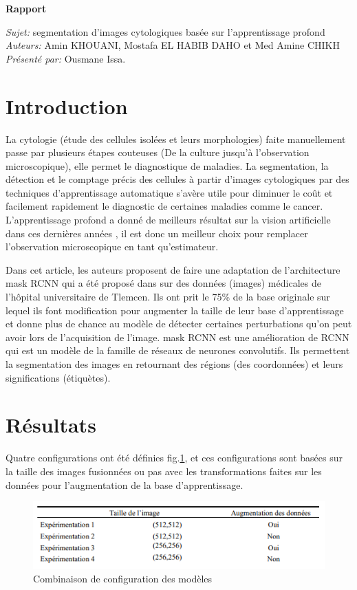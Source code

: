 \documentclass[french]{report}
\begin{document}
\begin{center}
	\LARGE \textbf{Rapport}
\end{center}
\textit{Sujet:} segmentation d'images cytologiques basée sur l'apprentissage profond\\
\textit{Auteurs:} Amin KHOUANI, Mostafa EL HABIB DAHO et Med Amine CHIKH \\
\textit{Présenté par:} Ousmane Issa.
\section*{Introduction}
La cytologie (étude des cellules isolées et leurs morphologies) faite manuellement passe par plusieurs étapes couteuses (De la culture jusqu'à l'observation microscopique), elle permet le diagnostique de maladies. La segmentation, la détection et le comptage précis des cellules à partir d'images cytologiques par des techniques d'apprentissage automatique s'avère utile pour diminuer le coût et facilement rapidement le diagnostic de certaines maladies comme le cancer. L'apprentissage profond a donné de meilleurs résultat sur la vision artificielle dans ces dernières années \cite{im1, rcnn}, il est donc un meilleur choix pour remplacer l'observation microscopique en tant qu'estimateur.

Dans cet article, les auteurs proposent de faire une adaptation de l'architecture mask RCNN qui a été proposé dans \cite{rcnn} sur des données (images) médicales de l'hôpital universitaire de Tlemcen. Ils ont prit le 75\% de la base originale sur lequel ils font modification pour augmenter la taille de leur base d'apprentissage et donne plus de chance au modèle de détecter certaines perturbations qu'on peut avoir lors de l'acquisition de l'image. mask RCNN est une amélioration de RCNN qui est un modèle de la famille de réseaux de neurones convolutifs. Ils permettent la segmentation des images en retournant des régions (des coordonnées) et leurs significations (étiquètes).   
\section*{Résultats}
Quatre configurations ont été définies fig.{\ref{comb}}, et ces configurations sont basées sur la taille des images fusionnées ou pas avec les transformations faites sur les données pour l'augmentation de la base d'apprentissage. 

\begin{figure}[H]
	\centering
	\includegraphics{images/rapport_1.PNG}
	\caption{Combinaison de configuration des modèles}
	\label{comb}
\end{figure} 
\end{document}
